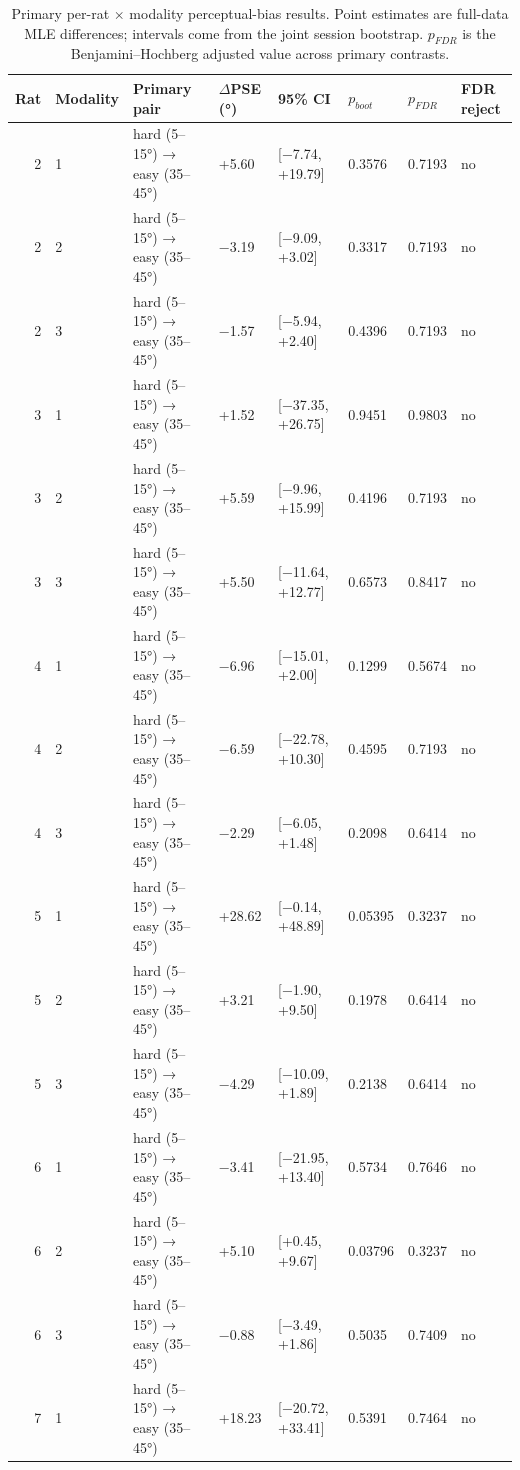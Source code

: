 \begin{table}[htbp]
  \centering
  \caption{Primary per-rat $\times$ modality perceptual-bias results. Point estimates are full-data MLE differences; intervals come from the joint session bootstrap. $p_{FDR}$ is the Benjamini--Hochberg adjusted value across primary contrasts.}
  \label{tab:perceptual_bias_summary}
  \begin{tabular}{rlllllll}
    \toprule
    Rat & Modality & Primary pair & $\Delta$PSE (°) & 95\% CI & $p_{boot}$ & $p_{FDR}$ & FDR reject \\
    \midrule
    2 & 1 & hard (5–15°) → easy (35–45°) & +5.60 & [−7.74, +19.79] & 0.3576 & 0.7193 & no \\
    2 & 2 & hard (5–15°) → easy (35–45°) & −3.19 & [−9.09, +3.02] & 0.3317 & 0.7193 & no \\
    2 & 3 & hard (5–15°) → easy (35–45°) & −1.57 & [−5.94, +2.40] & 0.4396 & 0.7193 & no \\
    3 & 1 & hard (5–15°) → easy (35–45°) & +1.52 & [−37.35, +26.75] & 0.9451 & 0.9803 & no \\
    3 & 2 & hard (5–15°) → easy (35–45°) & +5.59 & [−9.96, +15.99] & 0.4196 & 0.7193 & no \\
    3 & 3 & hard (5–15°) → easy (35–45°) & +5.50 & [−11.64, +12.77] & 0.6573 & 0.8417 & no \\
    4 & 1 & hard (5–15°) → easy (35–45°) & −6.96 & [−15.01, +2.00] & 0.1299 & 0.5674 & no \\
    4 & 2 & hard (5–15°) → easy (35–45°) & −6.59 & [−22.78, +10.30] & 0.4595 & 0.7193 & no \\
    4 & 3 & hard (5–15°) → easy (35–45°) & −2.29 & [−6.05, +1.48] & 0.2098 & 0.6414 & no \\
    5 & 1 & hard (5–15°) → easy (35–45°) & +28.62 & [−0.14, +48.89] & 0.05395 & 0.3237 & no \\
    5 & 2 & hard (5–15°) → easy (35–45°) & +3.21 & [−1.90, +9.50] & 0.1978 & 0.6414 & no \\
    5 & 3 & hard (5–15°) → easy (35–45°) & −4.29 & [−10.09, +1.89] & 0.2138 & 0.6414 & no \\
    6 & 1 & hard (5–15°) → easy (35–45°) & −3.41 & [−21.95, +13.40] & 0.5734 & 0.7646 & no \\
    6 & 2 & hard (5–15°) → easy (35–45°) & +5.10 & [+0.45, +9.67] & 0.03796 & 0.3237 & no \\
    6 & 3 & hard (5–15°) → easy (35–45°) & −0.88 & [−3.49, +1.86] & 0.5035 & 0.7409 & no \\
    7 & 1 & hard (5–15°) → easy (35–45°) & +18.23 & [−20.72, +33.41] & 0.5391 & 0.7464 & no \\

\end{tabular}
\end{table}
